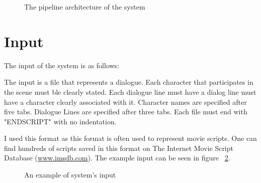 \begin{figure}[!ht]
\centerline{}
\caption{The pipeline architecture of the system}\label{fig:architecture}
\end{figure}


\section{Input}

The input of the system is as follows:

The input is a file that represents a dialogue. Each character that participates in the scene must ble clearly stated. Each dialogue line must have a dialog line must have a character clearly associated with it. Character names are specified after five tabs. Dialogue Lines are specified after three tabs. Each file must end with "ENDSCRIPT" with no indentation.

I used this format as this format is often used to represent movie scripts. One can find hundreds of scripts saved in this format on The Internet Movie Script Database (\url{www.imsdb.com}). The example input can be seen in figure ~\ref{fig:inputscript}.


\begin{figure}[!ht]
\centerline{}
\caption{An example of system's input}\label{fig:inputscript}
\end{figure}


